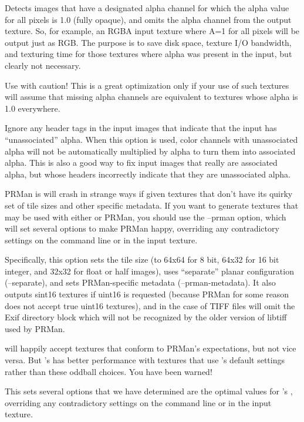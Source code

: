 Detects images that have a designated alpha channel for which the alpha value
for all pixels is 1.0 (fully opaque), and omits the alpha channel from
the output texture.  So, for example, an RGBA input texture where A=1
for all pixels will be output just as RGB.  The purpose is to save disk
space, texture I/O bandwidth, and texturing time for those textures
where alpha was present in the input, but clearly not necessary.

Use with caution!  This is a great optimization only if your use of such
textures will assume that missing alpha channels are equivalent to
textures whose alpha is 1.0 everywhere.
\apiend

Ignore any header tags in the input images that indicate that the
input has ``unassociated'' alpha.  When this option is used, color
channels with unassociated alpha will not be automatically multiplied
by alpha to turn them into associated alpha. This is also a good way
to fix input images that really are associated alpha, but whose headers
incorrectly indicate that they are unassociated alpha. 
\apiend

PRMan is will crash in strange ways if given textures that don't have
its quirky set of tile sizes and other specific metadata.  If you want
\maketx to generate textures that may be used with either \OpenImageIO
or PRMan, you should use the {\cf --prman} option, which will set
several options to make PRMan happy, overriding any contradictory
settings on the command line or in the input texture.  

Specifically, this option sets the tile size (to 64x64 for 8 bit,
64x32 for 16 bit integer, and 32x32 for float or {\cf half} images),
uses ``separate'' planar configuration ({\cf --separate}), and sets
PRMan-specific metadata ({\cf --prman-metadata}).  It also outputs 
sint16 textures if uint16 is requested (because PRMan for some reason
does not accept true uint16 textures), and in the case of TIFF files will
omit the Exif directory block which will not be recognized by the older
version of libtiff used by PRMan.

\OpenImageIO will happily accept textures that conform to PRMan's
expectations, but not vice versa.  But \OpenImageIO's \TextureSystem
has better performance with textures that use \maketx's default settings
rather than these oddball choices.  You have been warned!
\apiend

This sets several options that we have determined are the 
optimal values for \OpenImageIO's \TextureSystem, overriding any
contradictory settings on the command line or in the input texture.


